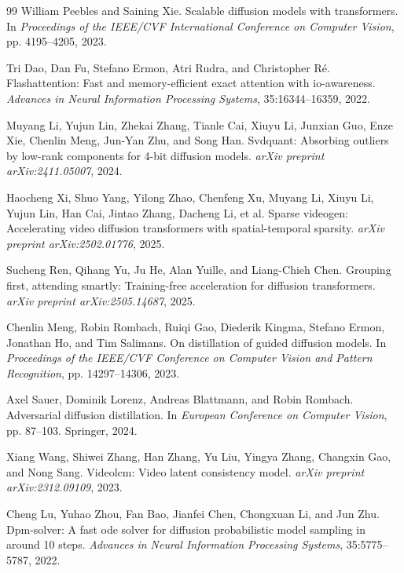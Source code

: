 \documentclass{article}
\begin{document}
\begin{thebibliography}{99}
William Peebles and Saining Xie.
\newblock Scalable diffusion models with transformers.
\newblock In \textit{Proceedings of the IEEE/CVF International Conference on Computer Vision}, pp. 4195--4205, 2023.

Tri Dao, Dan Fu, Stefano Ermon, Atri Rudra, and Christopher R\'{e}.
\newblock Flashattention: Fast and memory-efficient exact attention with io-awareness.
\newblock \textit{Advances in Neural Information Processing Systems}, 35:16344--16359, 2022.

Muyang Li, Yujun Lin, Zhekai Zhang, Tianle Cai, Xiuyu Li, Junxian Guo, Enze Xie, Chenlin Meng, Jun-Yan Zhu, and Song Han.
\newblock Svdquant: Absorbing outliers by low-rank components for 4-bit diffusion models.
\newblock \textit{arXiv preprint arXiv:2411.05007}, 2024.

Haocheng Xi, Shuo Yang, Yilong Zhao, Chenfeng Xu, Muyang Li, Xiuyu Li, Yujun Lin, Han Cai, Jintao Zhang, Dacheng Li, et al.
\newblock Sparse videogen: Accelerating video diffusion transformers with spatial-temporal sparsity.
\newblock \textit{arXiv preprint arXiv:2502.01776}, 2025.

Sucheng Ren, Qihang Yu, Ju He, Alan Yuille, and Liang-Chieh Chen.
\newblock Grouping first, attending smartly: Training-free acceleration for diffusion transformers.
\newblock \textit{arXiv preprint arXiv:2505.14687}, 2025.

Chenlin Meng, Robin Rombach, Ruiqi Gao, Diederik Kingma, Stefano Ermon, Jonathan Ho, and Tim Salimans.
\newblock On distillation of guided diffusion models.
\newblock In \textit{Proceedings of the IEEE/CVF Conference on Computer Vision and Pattern Recognition}, pp. 14297--14306, 2023.

Axel Sauer, Dominik Lorenz, Andreas Blattmann, and Robin Rombach.
\newblock Adversarial diffusion distillation.
\newblock In \textit{European Conference on Computer Vision}, pp. 87--103. Springer, 2024.

Xiang Wang, Shiwei Zhang, Han Zhang, Yu Liu, Yingya Zhang, Changxin Gao, and Nong Sang.
\newblock Videolcm: Video latent consistency model.
\newblock \textit{arXiv preprint arXiv:2312.09109}, 2023.

Cheng Lu, Yuhao Zhou, Fan Bao, Jianfei Chen, Chongxuan Li, and Jun Zhu.
\newblock Dpm-solver: A fast ode solver for diffusion probabilistic model sampling in around 10 steps.
\newblock \textit{Advances in Neural Information Processing Systems}, 35:5775--5787, 2022.


\end{thebibliography}
\end{document}
